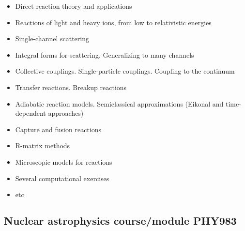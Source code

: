 \documentclass[%
twoside,                 %
final,                   %
10pt]{article}
\begin{document}
\begin{itemize}
\item Direct reaction theory and applications

\item Reactions of light and heavy ions, from low to relativistic energies

\item Single-channel scattering

\item Integral forms for scattering. Generalizing to many channels

\item Collective couplings. Single-particle couplings. Coupling to the continuum

\item Transfer reactions. Breakup reactions

\item Adiabatic reaction models. Semiclassical approximations (Eikonal and time-dependent approaches)

\item Capture and fusion reactions

\item R-matrix methods

\item Microscopic models for reactions

\item Several computational exercises

\item etc
\end{itemize}

\noindent



\subsection*{Nuclear astrophysics course/module PHY983}

\end{document}
